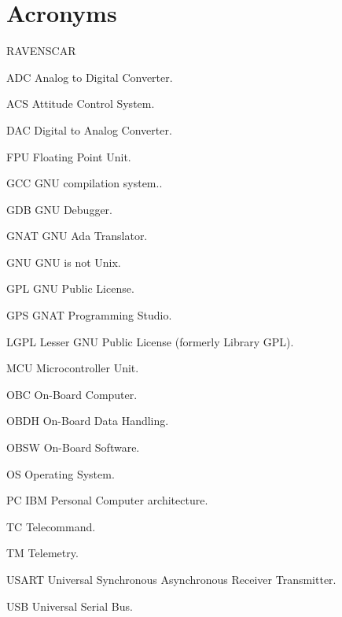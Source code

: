 
\section*{Acronyms}

\begin{entry}{RAVENSCAR}
\item[ADC] Analog to Digital Converter.
\item[ACS] Attitude Control System.
\item[DAC] Digital to Analog Converter.
\item[FPU] Floating Point Unit.
\item[GCC] GNU compilation system..
\item[GDB] GNU Debugger.
\item[GNAT] GNU Ada Translator.
\item[GNU] GNU is not Unix.
\item[GPL] GNU Public License.
\item[GPS] GNAT Programming Studio.
\item[LGPL] Lesser GNU Public License (formerly Library GPL).
\item[MCU] Microcontroller Unit.
\item[OBC] On-Board Computer.
\item[OBDH] On-Board Data Handling.
\item[OBSW] On-Board Software.
\item[OS] Operating System.
\item[PC] IBM Personal Computer architecture.
\item[TC] Telecommand.
\item[TM] Telemetry.
\item[USART] Universal Synchronous Asynchronous Receiver Transmitter.
\item[USB] Universal Serial Bus.
\end{entry}

